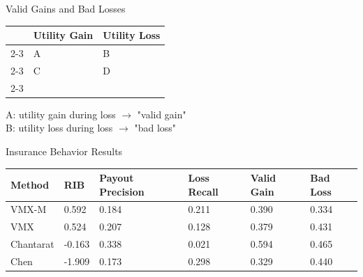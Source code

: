\documentclass{beamer}
\begin{document}
\begin{frame}{Valid Gains and Bad Losses}
    \begin{table}[]
        \centering
        \begin{tabular}{lll}
                                     & Utility Gain           & Utility Loss           \\ \cline{2-3} 
        \multicolumn{1}{l|}{Loss}    & \multicolumn{1}{l|}{A} & \multicolumn{1}{l|}{B} \\ \cline{2-3} 
        \multicolumn{1}{l|}{No Loss} & \multicolumn{1}{l|}{C} & \multicolumn{1}{l|}{D} \\ \cline{2-3} 
        \end{tabular}
        \end{table}

        A: utility gain during loss $\rightarrow$ "valid gain"\\
        B: utility loss during loss $\rightarrow$ "bad loss"
\end{frame}

    

\begin{frame}{Insurance Behavior Results}
    \begin{table}[]
        \centering
        \small
        \begin{tabular}{llllll}
        Method    & RIB    & Payout Precision & Loss Recall & Valid Gain & Bad Loss \\ \hline
        VMX-M     & 0.592  & 0.184            & 0.211       & 0.390          & 0.334        \\
        VMX       & 0.524  & 0.207            & 0.128       & 0.379          & 0.431        \\
        Chantarat & -0.163 & 0.338            & 0.021       & 0.594          & 0.465        \\
        Chen      & -1.909 & 0.173            & 0.298       & 0.329          & 0.440       
        \end{tabular}
        \end{table}
\end{frame}
\end{document}
